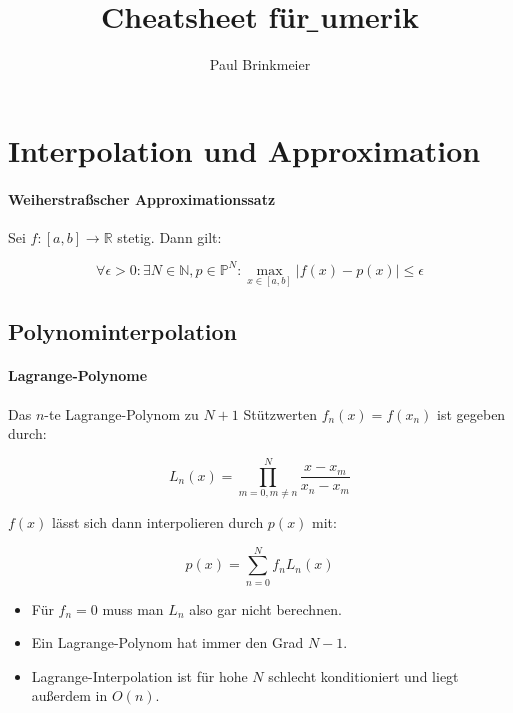 \documentclass[a4paper, 14pt]{article}
\author{Paul Brinkmeier}
\title{Cheatsheet für \b{}umerik}
\begin{document}
	\maketitle
	\newpage
	\tableofcontents
	\newpage

	\section{Interpolation und Approximation}

	\paragraph{Weiherstraßscher Approximationssatz}

	Sei $f : [a, b] \to \mathbb{R}$ stetig. Dann gilt:

	\begin{equation}
		\forall \epsilon > 0 : \exists N \in \mathbb{N}, p \in \mathbb{P}^N : \max_{x \in [a, b]}{|f(x) - p(x)|} \leq \epsilon
	\end{equation}

	\subsection{Polynominterpolation}

	\paragraph{Lagrange-Polynome} Das $n$-te Lagrange-Polynom zu $N + 1$ Stützwerten $f_n(x) = f(x_n)$ ist gegeben durch:

	\begin{equation}
		L_n(x) = \prod_{m = 0,m \neq n}^{N}{\frac{x - x_m}{x_n - x_m}}
	\end{equation}

	$f(x)$ lässt sich dann interpolieren durch $p(x)$ mit:

	\begin{equation}
		p(x) = \sum_{n = 0}^{N}{f_n L_n(x)}
	\end{equation}

	\begin{itemize}
		\item Für $f_n = 0$ muss man $L_n$ also gar nicht berechnen.
		\item Ein Lagrange-Polynom hat immer den Grad $N - 1$.
		\item Lagrange-Interpolation ist für hohe $N$ schlecht konditioniert und liegt außerdem in $O(n)$.
	\end{itemize}
\end{document}
